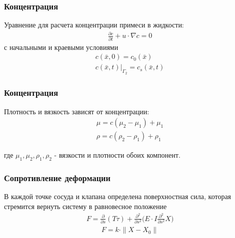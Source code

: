 \documentclass[14pt]{beamer}
\begin{document}
\begin{frame}
\frametitle{Концентрация}
Уравнение для расчета концентрации примеси в жидкости:
\begin{gather}
    \label{eq:concentration}
    \frac{\partial c}{\partial t} + u \cdot \nabla c = 0
\end{gather}
с начальными и краевыми условиями
\begin{gather*}
    c(\bar{x}, 0) = c_0(\bar{x})\\
    c(\bar{x}, t)|_{\Gamma_2} = c_s(\bar{x}, t)
\end{gather*}

\end{frame}

\begin{frame}
\frametitle{Концентрация}
Плотность и вязкость зависят от концентрации:
\begin{gather}
    \label{eq:concentration_viscosity}
    \mu = c (\mu_2 - \mu_1) + \mu_1\\
    \label{eq:concentration_density}
    \rho = c (\rho_2 - \rho_1) + \rho_1
\end{gather}

где $\mu_1, \mu_2, \rho_1, \rho_2$ - вязкости и плотности обоих компонент.
\end{frame}

\begin{frame}
\frametitle{Сопротивление деформации}
В каждой точке сосуда и клапана определена поверхностная сила, которая стремится вернуть систему в равновесное положение
\begin{gather}
    \label{eq:strain_energy}
    F =  \frac{\partial}{\partial s}(T \tau) + \frac{\partial^2}{\partial s^2} \Big( E \cdot I \frac{\partial^2}{\partial s^2} X \Big)
\end{gather}
\begin{gather}
    \label{eq:define_boundary_force}
    F = k \cdot \|X - X_0\|
\end{gather}
\end{frame}
\end{document}
